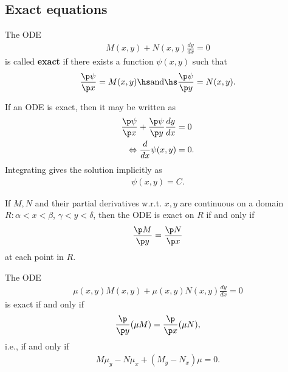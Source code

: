 \documentclass{article}
\begin{document}
\subsection{Exact equations}


\begin{definition}
    The ODE
    \begin{align*}
        M(x,y)+N(x,y)\frac{dy}{dx}=0
    \end{align*}
    is called \textbf{exact} if there exists a function $\psi(x,y)$ such that
    \begin{align*}
        \frac{\p \psi}{\p x}=M(x,y)\hs\text{and}\hs\frac{\p\psi}{\p y}=N(x,y).
    \end{align*}
\end{definition}

\begin{theorem}
    If an ODE is exact, then it may be written as
    \begin{align*}
        \frac{\p\psi}{\p x}+\frac{\p\psi}{\p y}\frac{dy}{dx} & =0  \\
        \Leftrightarrow \frac{d}{dx}\psi(x,y)                & =0.
    \end{align*}
    Integrating gives the solution implicitly as
    \begin{align*}
        \psi(x,y)=C.
    \end{align*}
\end{theorem}

\begin{theorem}
    If $M,N$ and their partial derivatives w.r.t. $x,y$ are continuous
    on a domain $R:\alpha<x<\beta$, $\gamma<y<\delta$, then the ODE is
    exact on $R$ if and only if
    \begin{align*}
        \frac{\p M}{\p y}=\frac{\p N}{\p x}
    \end{align*}
    at each point in $R$.
\end{theorem}

\begin{theorem}
    The ODE
    \begin{align*}
        \mu(x,y)M(x,y)+\mu(x,y)N(x,y)\frac{dy}{dx}=0
    \end{align*}
    is exact if and only if
    \begin{align*}
        \frac{\p}{\p y}(\mu M)=\frac{\p}{\p x}(\mu N),
    \end{align*}
    i.e., if and only if
    \begin{align*}
        M\mu_y - N\mu_x + (M_y - N_x)\mu = 0.
    \end{align*}
\end{theorem}
\end{document}
